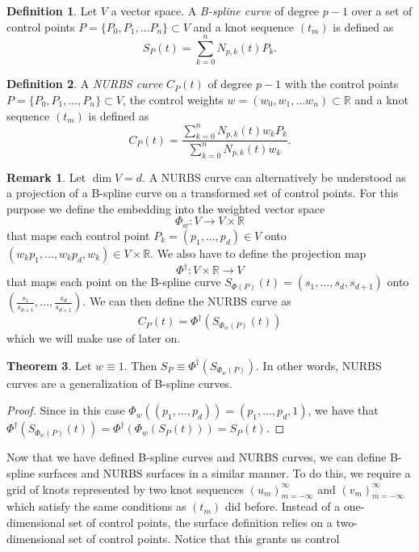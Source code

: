 \documentclass[a4paper, 11pt]{report}
\theoremstyle{definition}
\newtheorem{definition}{Definition}[section]
\newtheorem{theorem}[definition]{Theorem}
\newtheorem*{remark}{Remark}
\renewcommand{\emph}[1]{\textit{#1}}
\begin{document}
\begin{definition}
	Let $V$ a vector space. A \emph{B-spline curve} of degree $p-1$ over a set of control points $P = \{P_0, P_1, ... P_n\} \subset V$ and a knot sequence $(t_m)$ is defined as $$ S_P(t) = \sum_{k=0}^{n} N_{p,k}(t) P_k.$$
\end{definition}

\begin{definition}\label{def:nurbs}
	A \emph{NURBS curve} $C_P(t)$ of degree $p-1$ with the control points $P = \{P_0, P_1, ..., P_n\} \subset V$, the control weights $w = (w_0, w_1, ... w_n) \subset \mathbb{R}$ and a knot sequence $(t_m)$ is defined as
	\begin{equation}
		C_P(t) = \frac{\sum_{k=0}^n N_{p,k}(t) w_k P_k}{\sum_{k=0}^n N_{p,k}(t) w_k}.
	\end{equation}
\end{definition}

\begin{remark}
	Let $\dim V = d$. A NURBS curve can alternatively be understood as a projection of a B-spline curve on a transformed set of control points. For this purpose we define the embedding into the weighted vector space
		$$\Phi_w: V \rightarrow V \times \mathbb{R}$$
	that maps each control point $P_k = (p_1, ..., p_d) \in V$ onto $(w_k p_1, ..., w_k p_d, w_k) \in V \times \mathbb{R}$.
	We also have to define the projection map
		$$\Phi^\dagger: V \times \mathbb{R} \rightarrow V$$ 
	that maps each point on the B-spline curve $S_{\Phi(P)}(t) = (s_1, ..., s_d, s_{d+1})$ onto $(\frac{s_1}{s_{d+1}}, ..., \frac{s_d}{s_{d+1}})$.
	We can then define the NURBS curve as
			$$ C_P(t) = \Phi^\dagger(S_{\Phi_w(P)}(t))$$ 
	which we will make use of later on.
\end{remark}

\begin{theorem}
	Let $w \equiv 1$. Then $S_P \equiv \Phi^\dagger(S_{\Phi_w(P)})$. In other words, NURBS curves are a generalization of B-spline curves.
\end{theorem}
\begin{proof}
	Since in this case $\Phi_w((p_1, ..., p_d)) = (p_1, ..., p_d, 1)$, we have that $\Phi^\dagger(S_{\Phi_w(P)}(t)) = \Phi^\dagger(\Phi_w(S_P(t))) = S_P(t)$.
\end{proof}

Now that we have defined B-spline curves and NURBS curves, we can define B-spline surfaces and NURBS surfaces in a similar manner. To do this, we require a grid of knots represented by two knot sequences $(u_m)_{m=-\infty}^{\infty}$ and $(v_m)_{m=-\infty}^{\infty}$ which satisfy the same conditions as $(t_m)$ did before. Instead of a one-dimensional set of control points, the surface definition relies on a two-dimensional set of control points. Notice that this grants us control 
\end{document}
